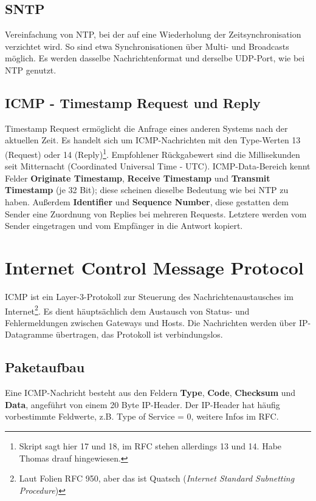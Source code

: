 \documentclass{article} %
\begin{document}
\subsection{SNTP}
Vereinfachung von NTP, bei der auf eine Wiederholung der Zeitsynchronisation verzichtet wird.
So sind etwa Synchronisationen über Multi- und Broadcasts möglich.
Es werden dasselbe Nachrichtenformat und derselbe UDP-Port, wie bei NTP genutzt\cite{rfc4330}.

\subsection{ICMP - Timestamp Request und Reply}
\label{subsec:icmptime}

Timestamp Request\cite{rfc792} ermöglicht die Anfrage eines anderen Systems nach der aktuellen Zeit.
Es handelt sich um ICMP-Nachrichten mit den Type-Werten 13 (Request) oder 14 (Reply)\footnote{Skript sagt hier 17 und 18, im RFC stehen allerdings 13 und 14. Habe Thomas drauf hingewiesen.}.
Empfohlener Rückgabewert sind die Millisekunden seit Mitternacht (Coordinated Universal Time - UTC).
ICMP-Data-Bereich kennt Felder \textbf{Originate Timestamp}, \textbf{Receive Timestamp} und \textbf{Transmit Timestamp} (je 32 Bit); diese scheinen dieselbe Bedeutung wie bei NTP zu haben.
Außerdem \textbf{Identifier} und \textbf{Sequence Number}, diese gestatten dem Sender eine Zuordnung von Replies bei mehreren Requests.
Letztere werden vom Sender eingetragen und vom Empfänger in die Antwort kopiert.

\section{Internet Control Message Protocol}

ICMP ist ein Layer-3-Protokoll zur Steuerung des Nachrichtenaustausches im Internet\cite{rfc792}\footnote{Laut Folien RFC 950\cite{rfc950}, aber das ist Quatsch (\emph{Internet Standard Subnetting Procedure})}.
Es dient häuptsächlich dem Austausch von Status- und Fehlermeldungen zwischen Gateways und Hosts.
Die Nachrichten werden über IP-Datagramme übertragen, das Protokoll ist verbindungslos.

\subsection{Paketaufbau}
Eine ICMP-Nachricht besteht aus den Feldern \textbf{Type}, \textbf{Code}, \textbf{Checksum} und \textbf{Data}, angeführt von einem 20 Byte IP-Header.
Der IP-Header hat häufig vorbestimmte Feldwerte, z.B. Type of Service = 0, weitere Infos im RFC.
\end{document}
